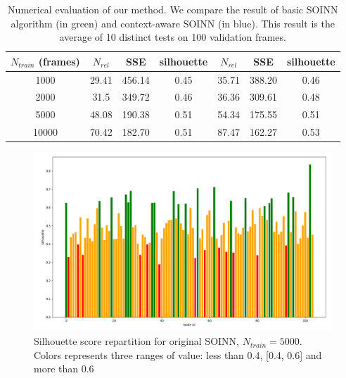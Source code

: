 \begin{table}[htp]
\centering
\caption[Numerical evaluation of our method]{Numerical evaluation of our method. We compare the result of basic SOINN algorithm (in green) and context-aware SOINN (in blue). This result is the average of 10 distinct tests on 100 validation frames.}
\label{tab:SOINN_comp}
\begin{tabular}{|c|c|c|c|c|c|c|}
    \hline
    $N_{train}$ (frames)  & \cellcolor[HTML]{009901}$N_{rel}$ & \cellcolor[HTML]{009901}SSE & \cellcolor[HTML]{009901}silhouette & \cellcolor[HTML]{3166FF}$N_{rel}$ & \cellcolor[HTML]{3166FF}SSE & \cellcolor[HTML]{3166FF}silhouette \\
    \hline
    1000 & 29.41 & 456.14 & 0.45 & 35.71 & 388.20 & 0.46 \\
    2000 & 31.5 & 349.72 & 0.46 & 36.36 & 309.61 & 0.48 \\
    5000 & 48.08 & 190.38 & 0.51 & 54.34 & 175.55 & 0.51 \\
    10000 & 70.42 & 182.70 & 0.51 & 87.47 & 162.27 & 0.53 \\
    \hline
\end{tabular}
\end{table}

\begin{figure}[ht]
    \centering
    \includegraphics[width=130mm, keepaspectratio]{images/silhouette_original.png}
    \caption[Silhouette score repartition for original SOINN]{Silhouette score repartition for original SOINN, $N_{train} = 5000$. Colors represents three ranges of value: less than 0.4, [0.4, 0.6] and more than 0.6}
    \label{fig:silhouette_before}
\end{figure}


